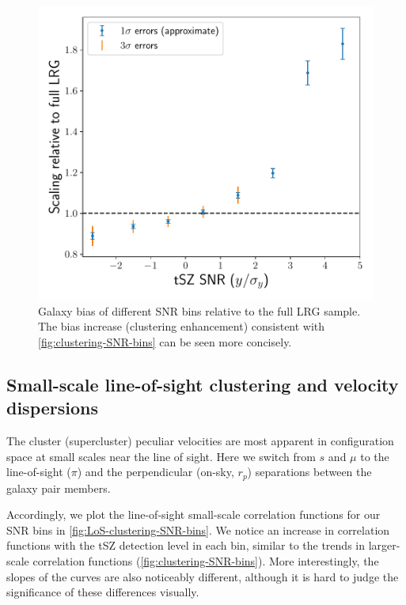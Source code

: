 \begin{figure}[htbp]
    \centering
    \includegraphics[width=\linewidth]{fig/LRG-z0.4-0.85-SZ-ACTPlanck-filtered2.4-monopole-jack-errorbars-relbias.pdf}
    \caption[Galaxy bias of different SNR bins relative to the full LRG sample]{Galaxy bias of different SNR bins relative to the full LRG sample.
    The bias increase (clustering enhancement) consistent with \cref{fig:clustering-SNR-bins} can be seen more concisely.}
    \label{fig:relbias-SNR-bins}
\end{figure}

\subsection{Small-scale line-of-sight clustering and velocity dispersions}
\label{sec:DESI-tSZ:measurements:small-LoS}

The cluster (supercluster) peculiar velocities are most apparent in configuration space at small scales near the line of sight.
Here we switch from $s$ and $\mu$ to the line-of-sight ($\pi$) and the perpendicular (on-sky, $r_p$) separations between the galaxy pair members.

Accordingly, we plot the line-of-sight small-scale correlation functions for our SNR bins in \cref{fig:LoS-clustering-SNR-bins}.
We notice an increase in correlation functions with the tSZ detection level in each bin, similar to the trends in larger-scale correlation functions (\cref{fig:clustering-SNR-bins}).
More interestingly, the slopes of the curves are also noticeably different, although it is hard to judge the significance of these differences visually.

